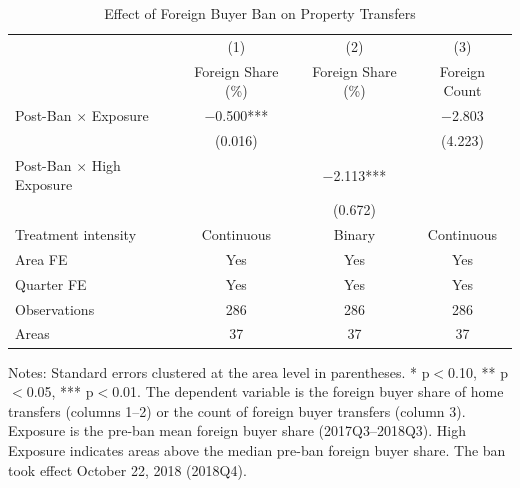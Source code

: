 \begin{table}[H]
\centering
\caption{Effect of Foreign Buyer Ban on Property Transfers}
\begin{threeparttable}
\begin{tabular}{lccc}
\toprule
& (1) & (2) & (3) \\
& Foreign Share (\%) & Foreign Share (\%) & Foreign Count \\
\midrule
Post-Ban $\times$ Exposure & $-$0.500*** & & $-$2.803 \\
& (0.016) & & (4.223) \\[6pt]
Post-Ban $\times$ High Exposure & & $-$2.113*** & \\
& & (0.672) & \\[6pt]
Treatment intensity & Continuous & Binary & Continuous \\
Area FE & Yes & Yes & Yes \\
Quarter FE & Yes & Yes & Yes \\
Observations & 286 & 286 & 286 \\
Areas & 37 & 37 & 37 \\
\bottomrule
\end{tabular}
\begin{tablenotes}[flushleft]
\small
\item Notes: Standard errors clustered at the area level in parentheses. * p$<$0.10, ** p$<$0.05, *** p$<$0.01. The dependent variable is the foreign buyer share of home transfers (columns 1--2) or the count of foreign buyer transfers (column 3). Exposure is the pre-ban mean foreign buyer share (2017Q3--2018Q3). High Exposure indicates areas above the median pre-ban foreign buyer share. The ban took effect October 22, 2018 (2018Q4).
\end{tablenotes}
\end{threeparttable}
\label{tab:main}
\end{table}

